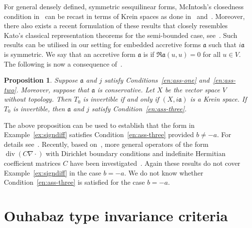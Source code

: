 \documentclass[a4paper,oneside,12pt]{amsart}
\theoremstyle{plain}
\newtheorem{proposition}[theorem]{Proposition}
\theoremstyle{definition}
\begin{document}
For general densely defined, symmetric sesquilinear forms, McIntosh's closedness condition in~\cite{McIntosh70:bilinear} can be recast in terms of Krein spaces
as done in~\cite{Fleige99} and~\cite{FHdS00}. Moreover, there also exists a
recent formulation of these results that closely resembles Kato's classical representation theorems for the
semi-bounded case, see~\cite{GKMV2013}.
Such results can be utilised in our setting for embedded accretive forms ${{\mathfrak{{a}}}}$ such that $i {{\mathfrak{{a}}}}$ is symmetric.
We say that an accretive form ${{\mathfrak{{a}}}}$ is {\textbf{\unboldmath}} if $\Re {{\mathfrak{{a}}}}(u,u)=0$ for all $u\in V$.
The following is now a consequence of~\cite[Theorem~V.1.3]{Bog74}.
\begin{proposition}\label{prop:Krein-Tinv}
Suppose ${{\mathfrak{{a}}}}$ and $j$ satisfy Conditions~\ref{en:ass-one} and~\ref{en:ass-two}.
Moreover, suppose that ${{\mathfrak{{a}}}}$ is conservative. Let $X$ be the vector space $V$ without topology.
Then $T_0$ is invertible if and only if $(X,i {{\mathfrak{{a}}}})$ is a Krein space.
If $T_0$ is invertible, then ${{\mathfrak{{a}}}}$ and $j$ satisfy Condition~\ref{en:ass-three}.
\end{proposition}

The above proposition can be used to establish that the form in Example~\ref{ex:signdiff} satisfies Condition~\ref{en:ass-three} provided $b\ne -a$.
For details see~\cite[Lemma~6]{Fleige99}.
Recently, based on~\cite{GKMV2013}, more general operators of the form $\operatorname{div}(C\nabla\cdot)$ with Dirichlet boundary conditions and indefinite Hermitian coefficient matrices $C$ have been investigated~\cite{Kos2012:ow-rep}. Again these results do not cover Example~\ref{ex:signdiff} in the case $b=-a$.
We do not know whether Condition~\ref{en:ass-three} is satisfied for the case $b=-a$.

\section{Ouhabaz type invariance criteria}\label{sec:invariance}
\end{document}
